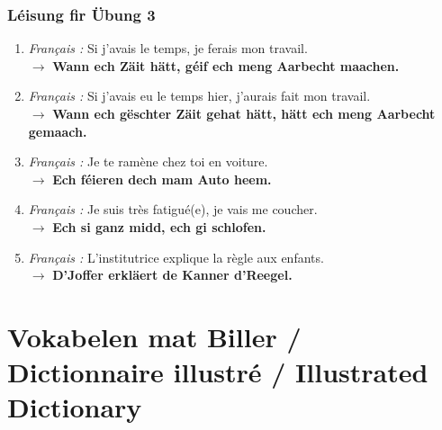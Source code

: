 \subsubsection*{Léisung fir Übung 3}
\begin{enumerate}
    \item \textit{Français :} Si j'avais le temps, je ferais mon travail. \\
    $\rightarrow$ \textbf{Wann ech Zäit hätt, géif ech meng Aarbecht maachen.}

    \item \textit{Français :} Si j'avais eu le temps hier, j'aurais fait mon travail. \\
    $\rightarrow$ \textbf{Wann ech gëschter Zäit gehat hätt, hätt ech meng Aarbecht gemaach.}

    \item \textit{Français :} Je te ramène chez toi en voiture. \\
    $\rightarrow$ \textbf{Ech féieren dech mam Auto heem.}

    \item \textit{Français :} Je suis très fatigué(e), je vais me coucher. \\
    $\rightarrow$ \textbf{Ech si ganz midd, ech gi schlofen.}

    \item \textit{Français :} L'institutrice explique la règle aux enfants. \\
    $\rightarrow$ \textbf{D'Joffer erkläert de Kanner d'Reegel.}
\end{enumerate}

\vspace{2em}

\section[Vokabelen mat Biller / Picture Dictionary]{Vokabelen mat Biller / Dictionnaire illustré / Illustrated Dictionary}

